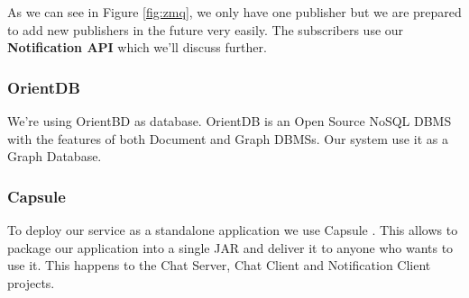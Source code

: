 As we can see in Figure \ref{fig:zmq}, we only have one publisher but we are prepared to add new publishers in the future very easily. The subscribers use our \textbf{Notification API} which we'll discuss further. 



\subsubsection{OrientDB} We're using OrientBD \cite{odb} as database. OrientDB is an Open Source NoSQL DBMS with the features of both Document and Graph DBMSs. Our system use it as a Graph Database.


\subsubsection{Capsule} To deploy our service as a standalone application we use Capsule \cite{capsule}. This allows to package our application into a single JAR and deliver it to anyone who wants to use it. This happens to the Chat Server, Chat Client and Notification Client projects.








